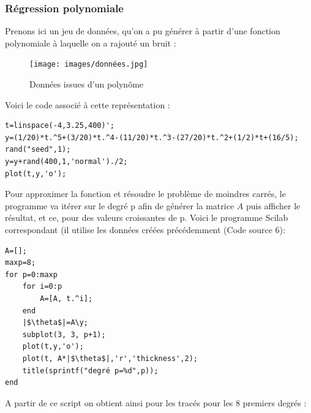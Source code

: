          \subsubsection{Régression polynomiale}
         Prenons ici un jeu de données, qu'on a pu générer à partir d'une fonction polynomiale à laquelle on a rajouté un bruit : 
         \begin{figure}[h]
              \centering
              \captionsetup{font=small}
                \texttt{[image: images/données.jpg]}
              \caption{Données issues d'un polynôme}
              \label{fig:reg2}
            \end{figure}
            \newpage
         Voici le code associé à cette représentation :
         \begin{center}
                \begin{verbatim}
t=linspace(-4,3.25,400)';
y=(1/20)*t.^5+(3/20)*t.^4-(11/20)*t.^3-(27/20)*t.^2+(1/2)*t+(16/5);
rand("seed",1);
y=y+rand(400,1,'normal')./2;
plot(t,y,'o');
                \end{verbatim}
                \label{lst:code_6}
         \end{center}
         Pour approximer la fonction et résoudre le problème de moindres carrés, le programme va itérer sur le degré p afin de générer la matrice $A$ puis afficher le résultat, et ce, pour des valeurs croissantes de p. Voici le programme Scilab correspondant (il utilise les données créées précédemment (Code source 6): 
         \begin{center}
                \begin{verbatim}
A=[];
maxp=8;
for p=0:maxp
    for i=0:p
        A=[A, t.^i];
    end
    |$\theta$|=A\y;
    subplot(3, 3, p+1);
    plot(t,y,'o');
    plot(t, A*|$\theta$|,'r','thickness',2);
    title(sprintf("degré p=%d",p));
end
                \end{verbatim}
                \label{lst:code_7}
         \end{center}
         \newpage
         A partir de ce script on obtient ainsi pour les tracés pour les 8 premiers degrés : 
